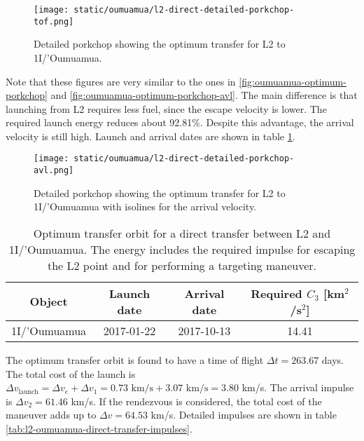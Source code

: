 \begin{figure}[H]
  \centering
  \texttt{[image: static/oumuamua/l2-direct-detailed-porkchop-tof.png]}
  \caption[Detailed porkchop showing the optimum transfer for
    L2 to 1I/'Oumuamua with the time of flight.]{Detailed porkchop showing the optimum transfer for
    L2 to 1I/'Oumuamua.
  }
  \label{fig:l2-oumuamua-optimum-porkchop}
\end{figure}

Note that these figures are very similar to the ones in
\ref{fig:oumuamua-optimum-porkchop} and \ref{fig:oumuamua-optimum-porkchop-avl}.
The main difference is that launching from L2 requires less fuel, since the
escape velocity is lower. The required launch energy reduces about 92.81\%.
Despite this advantage, the arrival velocity is still high. Launch and arrival
dates are shown in table \ref{tab:l2-oumuamua-direct-transfer-optimum}.

\begin{figure}[H]
  \centering
  \texttt{[image: static/oumuamua/l2-direct-detailed-porkchop-avl.png]}
  \caption[Detailed porkchop showing the optimum transfer for
    L2 to 1I/'Oumuamua with the arrival velocity.]{Detailed porkchop showing the
    optimum transfer for L2 to 1I/'Oumuamua with isolines for the arrival
    velocity.}
  \label{fig:l2-oumuamua-optimum-porkchop-avl}
\end{figure}

\vspace{1cm}
\begin{table}[H]
  \centering
  \begin{tabular}{|c|c|c|c|}
    \hline
    Object       & Launch date & Arrival date & Required $C_3$ [km$^2$/s$^2$] \\
    \hline
    1I/'Oumuamua & 2017-01-22  & 2017-10-13   & 14.41                         \\
    \hline
  \end{tabular}
  \caption[Optimum transfer orbit for a direct transfer between L2 and
    1I/'Oumuamua.]{Optimum transfer orbit for a direct transfer between
    L2 and 1I/'Oumuamua. The energy includes the required impulse for
    escaping the L2 point and for performing a targeting maneuver.}
  \label{tab:l2-oumuamua-direct-transfer-optimum}
\end{table}

The optimum transfer orbit is found to have a time of flight $\Delta t = 263.67$
days. The total cost of the launch is $\Delta v_\text{launch} = \Delta v_e +
  \Delta v_1 = 0.73 \text{ km/s} + 3.07 \text{ km/s} = 3.80$ km/s. The arrival
impulse is $\Delta v_2 = 61.46$ km/s. If the rendezvous is considered, the total
cost of the maneuver adds up to $\Delta v = 64.53$ km/s. Detailed impulses are
shown in table \ref{tab:l2-oumuamua-direct-transfer-impulses}.

